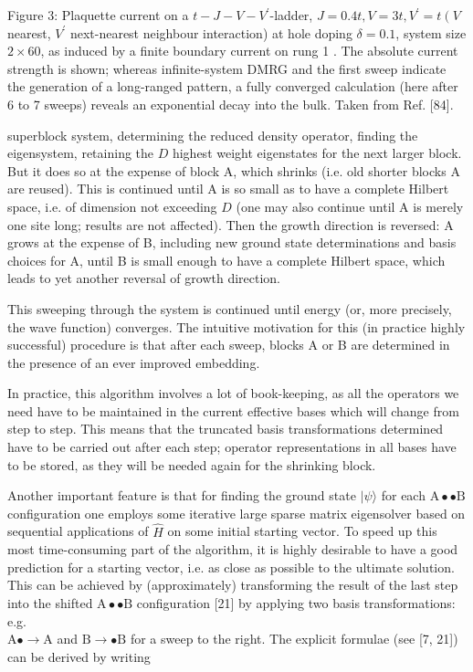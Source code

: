 \documentclass[12pt]{article}
\begin{document}
Figure 3: Plaquette current on a $t-J-V-V^{\prime}$-ladder, $J=0.4 t, V=3 t, V^{\prime}=t\left(V\right.$ nearest, $V^{\prime}$ next-nearest neighbour interaction) at hole doping $\delta=0.1$, system size $2 \times 60$, as induced by a finite boundary current on rung 1 . The absolute current strength is shown; whereas infinite-system DMRG and the first sweep indicate the generation of a long-ranged pattern, a fully converged calculation (here after 6 to 7 sweeps) reveals an exponential decay into the bulk. Taken from Ref. [84].

superblock system, determining the reduced density operator, finding the eigensystem, retaining the $D$ highest weight eigenstates for the next larger block. But it does so at the expense of block A, which shrinks (i.e. old shorter blocks A are reused). This is continued until A is so small as to have a complete Hilbert space, i.e. of dimension not exceeding $D$ (one may also continue until A is merely one site long; results are not affected). Then the growth direction is reversed: A grows at the expense of B, including new ground state determinations and basis choices for A, until B is small enough to have a complete Hilbert space, which leads to yet another reversal of growth direction.

This sweeping through the system is continued until energy (or, more precisely, the wave function) converges. The intuitive motivation for this (in practice highly successful) procedure is that after each sweep, blocks A or B are determined in the presence of an ever improved embedding.

In practice, this algorithm involves a lot of book-keeping, as all the operators we need have to be maintained in the current effective bases which will change from step to step. This means that the truncated basis transformations determined have to be carried out after each step; operator representations in all bases have to be stored, as they will be needed again for the shrinking block.

Another important feature is that for finding the ground state $|\psi\rangle$ for each $\mathrm{A} \bullet \bullet \mathrm{B}$ configuration one employs some iterative large sparse matrix eigensolver based on sequential applications of $\hat{H}$ on some initial starting vector. To speed up this most time-consuming part of the algorithm, it is highly desirable to have a good prediction for a starting vector, i.e. as close as possible to the ultimate solution. This can be achieved by (approximately) transforming the result of the last step into the shifted $\mathrm{A} \bullet \bullet \mathrm{B}$ configuration [21] by applying two basis transformations: e.g.\\
$\mathrm{A} \bullet \rightarrow \mathrm{A}$ and $\mathrm{B} \rightarrow \bullet \mathrm{B}$ for a sweep to the right. The explicit formulae (see [7, 21]) can be derived by writing
\end{document}
